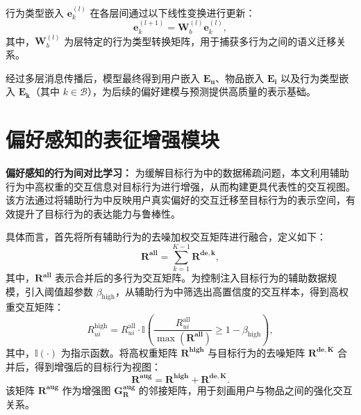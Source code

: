 行为类型嵌入 $\mathbf{e}^{(l)}_{k}$ 在各层间通过以下线性变换进行更新：
\begin{equation}
    \mathbf{e}^{(l+1)}_{k} = \mathbf{W}^{(l)}_{b} \mathbf{e}^{(l)}_{k},
\end{equation}
其中，$\mathbf{W}^{(l)}_{b}$ 为层特定的行为类型转换矩阵，用于捕获多行为之间的语义迁移关系。

经过多层消息传播后，模型最终得到用户嵌入 $\mathbf{E_{u}}$、物品嵌入 $\mathbf{E_{i}}$ 以及行为类型嵌入 $\mathbf{E_{k}}$（其中 $k \in \mathcal{B}$），为后续的偏好建模与预测提供高质量的表示基础。

\section{偏好感知的表征增强模块}
\textbf{偏好感知的行为间对比学习：}
为缓解目标行为中的数据稀疏问题，本文利用辅助行为中高权重的交互信息对目标行为进行增强，从而构建更具代表性的交互视图。该方法通过将辅助行为中反映用户真实偏好的交互迁移至目标行为的表示空间，有效提升了目标行为的表达能力与鲁棒性。

具体而言，首先将所有辅助行为的去噪加权交互矩阵进行融合，定义如下：
\begin{equation}
    \boldsymbol{R^{all}} = \sum_{k=1}^{K-1} \boldsymbol{R^{de,k}},
\end{equation}
其中，$\boldsymbol{R^{all}}$ 表示合并后的多行为交互矩阵。为控制注入目标行为的辅助数据规模，引入阈值超参数 $\beta_{\text{high}}$，从辅助行为中筛选出高置信度的交互样本，得到高权重交互矩阵：
\begin{equation}
    R_{ui}^{\text{high}} = R_{ui}^{\text{all}} \cdot 
    \mathbb{I}\!\left(
    \frac{R_{ui}^{\text{all}}}{\max(\mathbf{R^{all}})} 
    \geq 1 - \beta_{\text{high}}
    \right),
    \label{eq:w-all}
\end{equation}
其中，$\mathbb{I}(\cdot)$ 为指示函数。将高权重矩阵 $\boldsymbol{R^{high}}$ 与目标行为的去噪矩阵 $\boldsymbol{R^{de,K}}$ 合并后，得到增强后的目标行为视图：
\begin{equation}
    \boldsymbol{R^{aug}} = \boldsymbol{R^{high}} + \boldsymbol{R^{de,K}}.
\end{equation}
该矩阵 $\boldsymbol{R^{aug}}$ 作为增强图 $\boldsymbol{G_{R}^{aug}}$ 的邻接矩阵，用于刻画用户与物品之间的强化交互关系。

